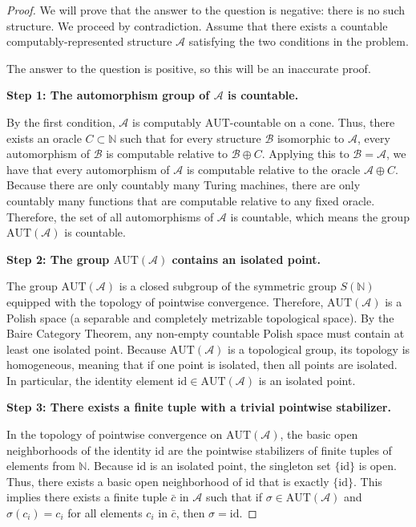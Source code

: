 \documentclass[12pt]{article}
\newcommand{\AUT}{\mathrm{AUT}}
\newcommand{\review}[1]{\begin{reviewbox}#1\end{reviewbox}}
\begin{document}
\begin{proof}
We will prove that the answer to the question is negative: there is no such structure. We proceed by contradiction. Assume that there exists a countable computably-represented structure $\mathcal{A}$ satisfying the two conditions in the problem.

\review{The answer to the question is positive, so this will be an inaccurate proof.}

\textbf{Step 1: The automorphism group of $\mathcal{A}$ is countable.}

By the first condition, $\mathcal{A}$ is computably $\AUT$-countable on a cone. Thus, there exists an oracle $C \subset \mathbb{N}$ such that for every structure $\mathcal{B}$ isomorphic to $\mathcal{A}$, every automorphism of $\mathcal{B}$ is computable relative to $\mathcal{B} \oplus C$. 
Applying this to $\mathcal{B} = \mathcal{A}$, we have that every automorphism of $\mathcal{A}$ is computable relative to the oracle $\mathcal{A} \oplus C$. Because there are only countably many Turing machines, there are only countably many functions that are computable relative to any fixed oracle. Therefore, the set of all automorphisms of $\mathcal{A}$ is countable, which means the group $\AUT(\mathcal{A})$ is countable.

\textbf{Step 2: The group $\AUT(\mathcal{A})$ contains an isolated point.}

The group $\AUT(\mathcal{A})$ is a closed subgroup of the symmetric group $S(\mathbb{N})$ equipped with the topology of pointwise convergence. Therefore, $\AUT(\mathcal{A})$ is a Polish space (a separable and completely metrizable topological space). 
By the Baire Category Theorem, any non-empty countable Polish space must contain at least one isolated point. Because $\AUT(\mathcal{A})$ is a topological group, its topology is homogeneous, meaning that if one point is isolated, then all points are isolated. In particular, the identity element $\mathrm{id} \in \AUT(\mathcal{A})$ is an isolated point.

\textbf{Step 3: There exists a finite tuple with a trivial pointwise stabilizer.}

In the topology of pointwise convergence on $\AUT(\mathcal{A})$, the basic open neighborhoods of the identity $\mathrm{id}$ are the pointwise stabilizers of finite tuples of elements from $\mathbb{N}$. 
Because $\mathrm{id}$ is an isolated point, the singleton set $\{\mathrm{id}\}$ is open. Thus, there exists a basic open neighborhood of $\mathrm{id}$ that is exactly $\{\mathrm{id}\}$. This implies there exists a finite tuple $\bar{c}$ in $\mathcal{A}$ such that if $\sigma \in \AUT(\mathcal{A})$ and $\sigma(c_i) = c_i$ for all elements $c_i$ in $\bar{c}$, then $\sigma = \mathrm{id}$.


\end{proof}
\end{document}
